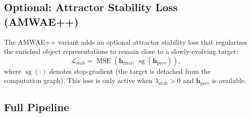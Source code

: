 \documentclass[runningheads]{llncs}
\newcommand{\op}[1]{\operatorname{#1}}
\newcommand{\mat}[1]{\bm{#1}}
\begin{document}
\subsection{Optional: Attractor Stability Loss (AMWAE++)}
\label{sec:stability}

The AMWAE++ variant adds an optional attractor stability loss that regularizes the enriched object representations to remain close to a slowly-evolving target:
\begin{equation}
    \mathcal{L}_{\text{stab}} = \op{MSE}(\mat{h}_{\text{final}},\, \op{sg}(\mat{h}_{\text{prev}})),
    \label{eq:stability_loss}
\end{equation}
where $\op{sg}(\cdot)$ denotes stop-gradient (the target is detached from the computation graph).  This loss is only active when $\lambda_{\text{stab}} > 0$ and $\mat{h}_{\text{prev}}$ is available.

\subsection{Full Pipeline}
\end{document}
